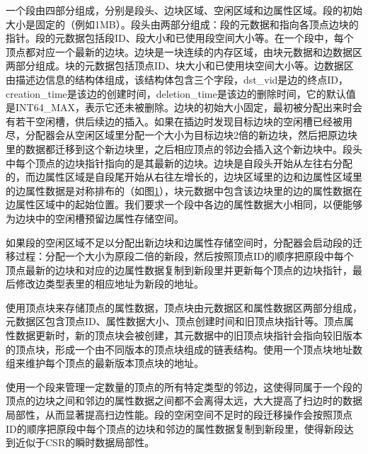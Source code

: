 一个段由四部分组成，分别是段头、边块区域、空闲区域和边属性区域。段的初始大小是固定的（例如1MB）。段头由两部分组成：段的元数据和指向各顶点边块的指针。段的元数据包括段ID、段大小和已使用段空间大小等。在一个段中，每个顶点都对应一个最新的边块。边块是一块连续的内存区域，由块元数据和边数据区两部分组成。块的元数据包括顶点ID、块大小和已使用块空间大小等。边数据区由描述边信息的结构体组成，该结构体包含三个字段，dst\_vid是边的终点ID，creation\_time是该边的创建时间，deletion\_time是该边的删除时间，它的默认值是INT64\_MAX，表示它还未被删除。边块的初始大小固定，最初被分配出来时会有若干空闲槽，供后续边的插入。如果在插边时发现目标边块的空闲槽已经被用尽，分配器会从空闲区域里分配一个大小为目标边块2倍的新边块，然后把原边块里的数据都迁移到这个新边块里，之后相应顶点的邻边会插入这个新边块中。段头中每个顶点的边块指针指向的是其最新的边块。边块是自段头开始从左往右分配的，而边属性区域是自段尾开始从右往左增长的，边块区域里的边和边属性区域里的边属性数据是对称排布的（如图\ref{edge_property}），块元数据中包含该边块里的边的属性数据在边属性区域中的起始位置。我们要求一个段中各边的属性数据大小相同，以便能够为边块中的空闲槽预留边属性存储空间。

\begin{figure}[htb]
\label{edge_property}
\end{figure}

如果段的空闲区域不足以分配出新边块和边属性存储空间时，分配器会启动段的迁移过程：分配一个大小为原段二倍的新段，然后按照顶点ID的顺序把原段中每个顶点最新的边块和对应的边属性数据复制到新段里并更新每个顶点的边块指针，最后修改边类型表里的相应地址为新段的地址。

\store 使用顶点块来存储顶点的属性数据，顶点块由元数据区和属性数据区两部分组成，元数据区包含顶点ID、属性数据大小、顶点创建时间和旧顶点块指针等。顶点属性数据更新时，新的顶点块会被创建，其元数据中的旧顶点块指针会指向较旧版本的顶点块，形成一个由不同版本的顶点块组成的链表结构。\store 使用一个顶点块地址数组来维护每个顶点的最新版本顶点块的地址。

\store 使用一个段来管理一定数量的顶点的所有特定类型的邻边，这使得同属于一个段的顶点的边块之间和邻边的属性数据之间都不会离得太远，大大提高了扫边时的数据局部性，从而显著提高扫边性能。段的空闲空间不足时的段迁移操作会按照顶点ID的顺序把原段中每个顶点的边块和邻边的属性数据复制到新段里，使得新段达到近似于CSR的瞬时数据局部性。

